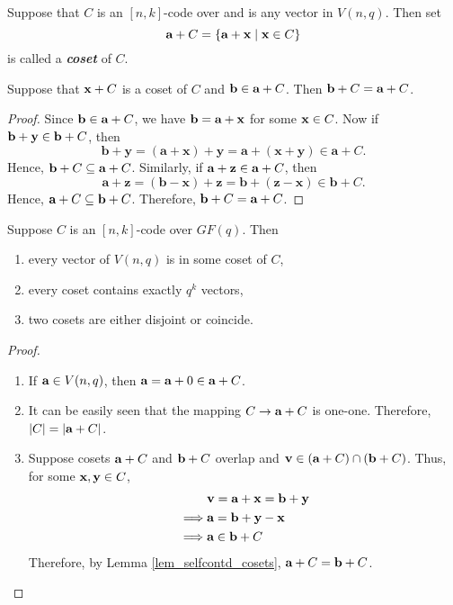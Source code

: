 \documentclass[../main.tex]{subfiles}
\newcommand{\coset}[1]{\code{#1}+C}
\begin{document}
\begin{defn}
	Suppose that $C$ is an $[n,k]$-code over and  is any vector in $V(n,q)$. Then set
	\[
		\textbf{a}+C=\{\textbf{a}+\textbf{x}\;|\; \textbf{x}\in C\}
	\]
	is called a \textbf{\emph{coset}} of $C$.
\end{defn}
\begin{lem}\label{lem_selfcontd_cosets}
	Suppose that $\textbf{x}+C$ is a coset of $C$ and $\textbf{b}\in \textbf{a}+C$. Then $\textbf{b}+C=\textbf{a}+C$.
\end{lem}
\begin{proof}
	Since $\textbf{b}\in \textbf{a}+C$, we have $\textbf{b}=\textbf{a}+\textbf{x}$ for some $\textbf{x}\in C$. Now if $\textbf{b}+\textbf{y}\in \textbf{b}+C$, then
	\[
		\textbf{b}+\textbf{y}=(\textbf{a}+\textbf{x})+\textbf{y}=\textbf{a}+(\textbf{x}+\textbf{y})\in \textbf{a}+C.
	\]
	Hence, $\textbf{b}+C\subseteq \textbf{a}+C$. Similarly, if $\textbf{a}+\textbf{z}\in \textbf{a}+C$, then
	\[
		\textbf{a}+\textbf{z}=(\textbf{b}-\textbf{x})+\textbf{z}=\textbf{b}+(\textbf{z}-\textbf{x})\in \textbf{b}+C.
	\]
	Hence, $\textbf{a}+C\subseteq \textbf{b}+C$. Therefore, $\textbf{b}+C=\textbf{a}+C$.
\end{proof}

\begin{thm}\label{thm_lagrange-subgroups}
	Suppose $C$ is an $[n,k]$-code over $GF(q)$. Then
	\begin{enumerate}[label=(\roman*)]
	\itemsep-1mm
		\item every vector of $V(n,q)$ is in some coset of $C$,
		\item every coset contains exactly $q^k$ vectors,
		\item two cosets are either disjoint or coincide.
	\end{enumerate}
\end{thm}
\begin{proof}
	\hfill
	\begin{enumerate}[label=(\roman*)]
	\itemsep-1mm
		\item If $\textbf{a}\in V(n,q)$, then $\textbf{a}=\textbf{a}+0\in \textbf{a}+C$.
		\item It can be easily seen that the mapping $C\rightarrow \textbf{a}+C$ is one-one. Therefore, $|C|=|\textbf{a}+C|$.
		\item Suppose cosets $\coset{a}$ and $\coset{b}$ overlap and $\code{v}\in (\coset{a})\cap (\coset{b})$. Thus, for some $\textbf{x},\textbf{y}\in C$, 
		\begin{align*}
			& \code{v} = \code{a}+\code{x} = \code{b}+\code{y}\\
			\implies & \code{a} = \code{b}+\code{y}-\code{x}\\
			\implies & \code{a}\in \coset{b}\\
		\end{align*}
		Therefore, by Lemma \ref{lem_selfcontd_cosets}, $\coset{a}=\coset{b}$.   
	\end{enumerate}
\end{proof}
\end{document}
